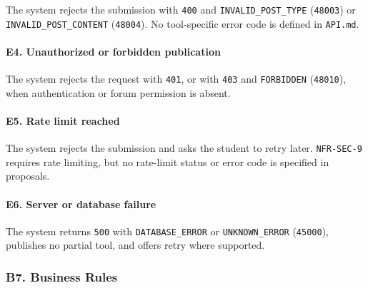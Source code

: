 \documentclass[12pt]{article}
\begin{document}
The system rejects the submission with \texttt{400} and \texttt{INVALID\_POST\_TYPE} (\texttt{48003}) or \texttt{INVALID\_POST\_CONTENT} (\texttt{48004}). No tool-specific error code is defined in \texttt{API.md}.
\par\medskip

\hypertarget{sec:e4-unauthorized-or-forbidden-publication}{}
\paragraph*{E4. Unauthorized or forbidden publication}
\par\medskip

The system rejects the request with \texttt{401}, or with \texttt{403} and \texttt{FORBIDDEN} (\texttt{48010}), when authentication or forum permission is absent.
\par\medskip

\hypertarget{sec:e5-rate-limit-reached}{}
\paragraph*{E5. Rate limit reached}
\par\medskip

The system rejects the submission and asks the student to retry later. \texttt{NFR-SEC-9} requires rate limiting, but no rate-limit status or error code is specified in proposals.
\par\medskip

\hypertarget{sec:e6-server-or-database-failure}{}
\paragraph*{E6. Server or database failure}
\par\medskip

The system returns \texttt{500} with \texttt{DATABASE\_ERROR} or \texttt{UNKNOWN\_ERROR} (\texttt{45000}), publishes no partial tool, and offers retry where supported.
\par\medskip

\hypertarget{sec:b7-business-rules}{}
\subsubsection*{B7. Business Rules}
\par\medskip
\end{document}
